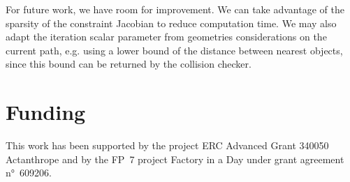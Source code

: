 \documentclass{tADR2e}
\begin{document}
For future work, we have room for improvement. We can take advantage of the sparsity of 
the constraint Jacobian to reduce computation time. We may also adapt the iteration 
scalar parameter from geometries considerations on the current path, e.g. using a lower 
bound of the distance between nearest objects, since this bound can be returned by 
the collision checker.

\section*{Funding}
This work has been supported by the project ERC Advanced Grant 340050 Actanthrope and by the FP~7 project Factory in a Day under grant agreement n°~609206.

\begin{figure}
	\centering
\end{figure}
\end{document}
